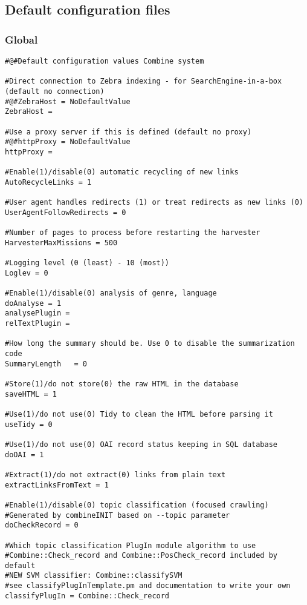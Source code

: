 \subsection{Default configuration files}

\label{conffiles}
\subsubsection{Global}

\begin{verbatim}
#@#Default configuration values Combine system

#Direct connection to Zebra indexing - for SearchEngine-in-a-box (default no connection)
#@#ZebraHost = NoDefaultValue
ZebraHost =

#Use a proxy server if this is defined (default no proxy)
#@#httpProxy = NoDefaultValue
httpProxy =

#Enable(1)/disable(0) automatic recycling of new links
AutoRecycleLinks = 1

#User agent handles redirects (1) or treat redirects as new links (0)
UserAgentFollowRedirects = 0

#Number of pages to process before restarting the harvester
HarvesterMaxMissions = 500

#Logging level (0 (least) - 10 (most))
Loglev = 0

#Enable(1)/disable(0) analysis of genre, language
doAnalyse = 1
analysePlugin =
relTextPlugin =

#How long the summary should be. Use 0 to disable the summarization code
SummaryLength   = 0

#Store(1)/do not store(0) the raw HTML in the database
saveHTML = 1

#Use(1)/do not use(0) Tidy to clean the HTML before parsing it
useTidy = 0

#Use(1)/do not use(0) OAI record status keeping in SQL database
doOAI = 1

#Extract(1)/do not extract(0) links from plain text
extractLinksFromText = 1

#Enable(1)/disable(0) topic classification (focused crawling)
#Generated by combineINIT based on --topic parameter
doCheckRecord = 0

#Which topic classification PlugIn module algorithm to use
#Combine::Check_record and Combine::PosCheck_record included by default
#NEW SVM classifier: Combine::classifySVM
#see classifyPlugInTemplate.pm and documentation to write your own
classifyPlugIn = Combine::Check_record


\end{verbatim}
